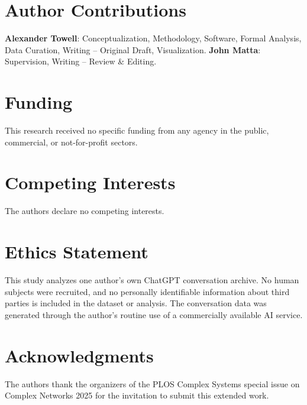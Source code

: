 \documentclass[10pt,letterpaper]{article}
\begin{document}
\section*{Author Contributions}
\textbf{Alexander Towell}: Conceptualization, Methodology, Software, Formal Analysis, Data Curation, Writing -- Original Draft, Visualization.
\textbf{John Matta}: Supervision, Writing -- Review \& Editing.

\section*{Funding}
This research received no specific funding from any agency in the public, commercial, or not-for-profit sectors.

\section*{Competing Interests}
The authors declare no competing interests.

\section*{Ethics Statement}
This study analyzes one author's own ChatGPT conversation archive. No human subjects were recruited, and no personally identifiable information about third parties is included in the dataset or analysis. The conversation data was generated through the author's routine use of a commercially available AI service.

\section*{Acknowledgments}
The authors thank the organizers of the PLOS Complex Systems special issue on Complex Networks 2025 for the invitation to submit this extended work.




\end{document}
